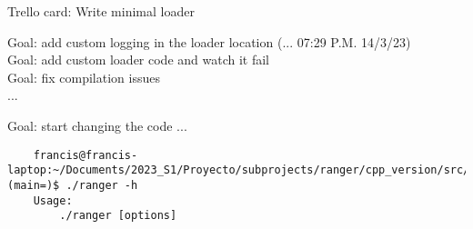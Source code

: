 \documentclass[12pt,oneside]{book}
\begin{document}
  Trello card: Write minimal loader

  Goal: add custom logging in the loader location (... 07:29 P.M. 14/3/23) \\
  Goal: add custom loader code and watch it fail \\ 
  Goal: fix compilation issues \\
  
  ...

  Goal: start changing the code ... \\


  \begin{lstlisting}
    francis@francis-laptop:~/Documents/2023_S1/Proyecto/subprojects/ranger/cpp_version/src/build (main=)$ ./ranger -h
    Usage: 
        ./ranger [options]
    

\end{lstlisting}
\end{document}
